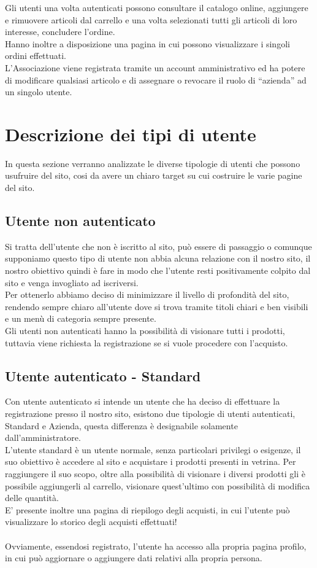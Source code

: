 Gli utenti una volta autenticati possono consultare il catalogo online, aggiungere e rimuovere articoli dal carrello e una volta selezionati tutti gli articoli di loro interesse, concludere l’ordine. \\
Hanno inoltre a disposizione una pagina in cui possono visualizzare i singoli ordini effettuati.\\

L’Associazione viene registrata tramite un account amministrativo ed ha potere di modificare qualsiasi articolo e di assegnare o revocare il ruolo di “azienda” ad un singolo utente.
\section{Descrizione dei tipi di utente}
In questa sezione verranno analizzate le diverse tipologie di utenti che possono usufruire del sito, cosi da avere un chiaro target su cui costruire le varie pagine del sito.
\subsection{Utente non autenticato}
	Si tratta dell'utente che non è iscritto al sito, può essere di passaggio o comunque supponiamo questo tipo di utente non abbia alcuna relazione con il nostro sito, il nostro obiettivo quindi è fare in modo che l'utente resti positivamente colpito dal sito e venga invogliato ad iscriversi.\\
	Per ottenerlo abbiamo deciso di minimizzare il livello di profondità del sito, rendendo sempre chiaro all'utente dove si trova tramite titoli chiari e ben visibili e un menù di categoria sempre presente.\\
	Gli utenti non autenticati hanno la possibilità di visionare tutti i prodotti, tuttavia viene richiesta la registrazione se si vuole procedere con l'acquisto.

\subsection{Utente autenticato - Standard}
	Con utente autenticato si intende un utente che ha deciso di effettuare la registrazione presso il nostro sito, esistono due tipologie di utenti autenticati, Standard e Azienda, questa differenza è designabile solamente dall'amministratore. \\
	L'utente standard è un utente normale, senza particolari privilegi o esigenze, il suo obiettivo è accedere al sito e acquistare i prodotti presenti in vetrina. Per raggiungere il suo scopo, oltre alla possibilità di visionare i diversi prodotti gli è possibile aggiungerli al carrello, visionare quest'ultimo con possibilità di modifica delle quantità.\\
	E' presente inoltre una pagina di riepilogo degli acquisti, in cui l'utente può visualizzare lo storico degli acquisti effettuati!\\\\
	Ovviamente, essendosi registrato, l'utente ha accesso alla propria pagina profilo, in cui può aggiornare o aggiungere dati relativi alla propria persona.


